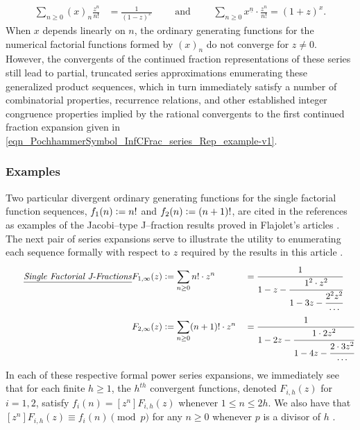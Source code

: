 \documentclass[12pt,reqno]{article}
\numberwithin{sfootnote}{section}
\numberwithin{equation}{section}
\newcommand{\tagtext}[1]{\tag*{\underline{\textit{#1}}}}
\theoremstyle{plain}
\theoremstyle{definition}
\theoremstyle{remark}
\newcommand{\cf}[0]{cf.\ }
\newcommand{\defequals}{\ensuremath{\vcentcolon=}}
\newcommand{\FFactII}[2]{\ensuremath{#1^{\underline{#2}}}}
\newcommand{\Pochhammer}[2]{\ensuremath{\left(#1\right)_{#2}}}
\begin{document}
\begin{align*} 
\sum_{n \geq 0} \Pochhammer{x}{n} \frac{z^n}{n!} & = \frac{1}{(1-z)^{x}} 
     \qquad \text{ and } \qquad 
\sum_{n \geq 0} \FFactII{x}{n} \cdot \frac{z^{n}}{n!} = (1+z)^{x}. 
\end{align*} 
When $x$ depends linearly on $n$, the ordinary generating 
functions for the numerical factorial functions formed by 
$(x)_n$ do not converge for $z \neq 0$. 
However, the convergents of the continued fraction representations of 
these series still lead to partial, truncated series approximations 
enumerating these generalized product sequences, 
which in turn immediately satisfy a number of 
combinatorial properties, recurrence relations, and other 
established integer congruence properties implied by the 
rational convergents to the first continued fraction expansion given in 
\eqref{eqn_PochhammerSymbol_InfCFrac_series_Rep_example-v1}. 

\subsubsection{Examples} 

Two particular divergent ordinary generating functions 
for the single factorial function sequences, 
$f_1(n) \defequals n!$ and $f_2(n) \defequals (n+1)!$, 
are cited in the references as examples of the 
Jacobi--type J--fraction results proved in 
Flajolet's articles 
\citep{FLAJOLET80B,FLAJOLET82} \citep[\cf \S 5.5]{GFLECT}. 
The next pair of series expansions serve to illustrate the utility to 
enumerating each sequence formally with respect to $z$ 
required by the results in this article 
\citep[Thm. 3A; Thm. 3B]{FLAJOLET80B}. 
\begin{align*} 
\tagtext{Single Factorial J-Fractions} 
F_{1,\infty}(z) & \defequals 
     \sum_{n \geq 0} n! \cdot z^n && = 
     \cfrac{1}{1-z-\cfrac{1^2 \cdot z^2}{ 
     1-3z-\cfrac{2^2 z^2}{\cdots}}} \\ 
F_{2,\infty}(z) & \defequals 
     \sum_{n \geq 0} (n+1)! \cdot z^n && = 
     \cfrac{1}{1-2z-\cfrac{1 \cdot 2 z^2}{ 
     1-4z-\cfrac{2 \cdot 3 z^2}{\cdots}}} 
\end{align*} 
In each of these respective formal power series expansions, 
we immediately see that for each finite $h \geq 1$, the 
$h^{th}$ convergent functions, denoted $F_{i,h}(z)$ for $i = 1,2$, 
satisfy $f_i(n) = [z^n] F_{i,h}(z)$ whenever $1 \leq n \leq 2h$. 
We also have that 
$[z^n] F_{i,h}(z) \equiv f_i(n) \pmod{p}$ 
for any $n \geq 0$ whenever $p$ is a divisor of $h$ 
\citep{FLAJOLET82} \citep[\cf \S 5]{GFLECT}. 
\end{document}
